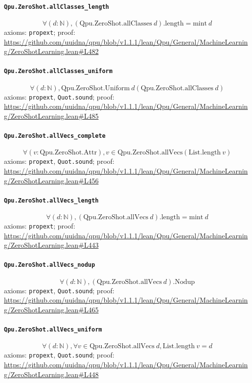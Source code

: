\documentclass[11pt]{article}
\begin{document}
\paragraph{\texttt{Qpu.ZeroShot.allClasses\_length}}
\[ \forall (d : \mathbb{N}), (\mathrm{Qpu.ZeroShot.allClasses}\ d)\mathrm{.length} = \mathrm{mint}\ d \]
\noindent axioms: \texttt{propext}; proof: \url{https://github.com/uuidna/qpu/blob/v1.1.1/lean/Qpu/General/MachineLearning/ZeroShotLearning.lean\#L482}

\paragraph{\texttt{Qpu.ZeroShot.allClasses\_uniform}}
\[ \forall (d : \mathbb{N}), \mathrm{Qpu.ZeroShot.Uniform}\ d (\mathrm{Qpu.ZeroShot.allClasses}\ d) \]
\noindent axioms: \texttt{propext}, \texttt{Quot.sound}; proof: \url{https://github.com/uuidna/qpu/blob/v1.1.1/lean/Qpu/General/MachineLearning/ZeroShotLearning.lean\#L485}

\paragraph{\texttt{Qpu.ZeroShot.allVecs\_complete}}
\[ \forall (v : \mathrm{Qpu.ZeroShot.Attr}), v \in \mathrm{Qpu.ZeroShot.allVecs} (\mathrm{List.length}\ v) \]
\noindent axioms: \texttt{propext}, \texttt{Quot.sound}; proof: \url{https://github.com/uuidna/qpu/blob/v1.1.1/lean/Qpu/General/MachineLearning/ZeroShotLearning.lean\#L456}

\paragraph{\texttt{Qpu.ZeroShot.allVecs\_length}}
\[ \forall (d : \mathbb{N}), (\mathrm{Qpu.ZeroShot.allVecs}\ d)\mathrm{.length} = \mathrm{mint}\ d \]
\noindent axioms: \texttt{propext}; proof: \url{https://github.com/uuidna/qpu/blob/v1.1.1/lean/Qpu/General/MachineLearning/ZeroShotLearning.lean\#L443}

\paragraph{\texttt{Qpu.ZeroShot.allVecs\_nodup}}
\[ \forall (d : \mathbb{N}), (\mathrm{Qpu.ZeroShot.allVecs}\ d)\mathrm{.Nodup} \]
\noindent axioms: \texttt{propext}, \texttt{Quot.sound}; proof: \url{https://github.com/uuidna/qpu/blob/v1.1.1/lean/Qpu/General/MachineLearning/ZeroShotLearning.lean\#L465}

\paragraph{\texttt{Qpu.ZeroShot.allVecs\_uniform}}
\[ \forall (d : \mathbb{N}), \forall v \in \mathrm{Qpu.ZeroShot.allVecs}\ d, \mathrm{List.length}\ v = d \]
\noindent axioms: \texttt{propext}, \texttt{Quot.sound}; proof: \url{https://github.com/uuidna/qpu/blob/v1.1.1/lean/Qpu/General/MachineLearning/ZeroShotLearning.lean\#L448}
\end{document}
